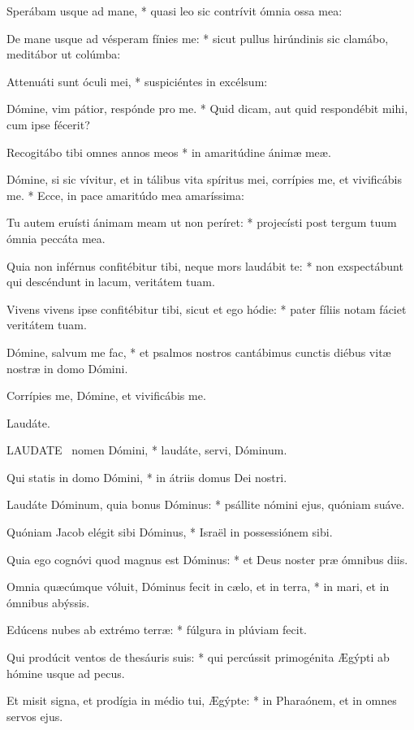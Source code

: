 Sperábam usque ad mane, * quasi leo sic contrívit ómnia ossa mea:

De mane usque ad vésperam fínies me: * sicut pullus hirúndinis sic clamábo, meditábor ut colúmba:

Attenuáti sunt óculi mei, * suspiciéntes in excélsum:

Dómine, vim pátior, respónde pro me. * Quid dicam, aut quid respondébit mihi, cum ipse fécerit?

Recogitábo tibi omnes annos meos * in amaritúdine ánimæ meæ.

Dómine, si sic vívitur, et in tálibus vita spíritus mei, corrípies me, et vivificábis me. * Ecce, in pace amaritúdo mea amaríssima:

Tu autem eruísti ánimam meam ut non períret: * projecísti post tergum tuum ómnia peccáta mea.

Quia non inférnus confitébitur tibi, neque mors laudábit te: * non exspectábunt qui descéndunt in lacum, veritátem tuam.

Vivens vivens ipse confitébitur tibi, sicut et ego hódie: * pater fíliis notam fáciet veritátem tuam.

Dómine, salvum me fac, * et psalmos nostros cantábimus cunctis diébus vitæ nostræ in domo Dómini.

 Corrípies me, Dómine, et vivificábis me.

 Laudáte. \textdagger


\lettrine[lines=2]{L}{AUDATE} \textdagger\ nomen Dómini, * laudáte, servi, Dóminum.

Qui statis in domo Dómini, * in átriis domus Dei nostri.

Laudáte Dóminum, quia bonus Dóminus: * psállite nómini ejus, quóniam suáve.

Quóniam Jacob elégit sibi Dóminus, * Israël in possessiónem sibi.

Quia ego cognóvi quod magnus est Dóminus: * et Deus noster præ ómnibus diis.

Omnia quæcúmque vóluit, Dóminus fecit in cælo, et in terra, * in mari, et in ómnibus abýssis.

Edúcens nubes ab extrémo terræ: * fúlgura in plúviam fecit.

Qui prodúcit ventos de thesáuris suis: * qui percússit primogénita Ægýpti ab hómine usque ad pecus.

Et misit signa, et prodígia in médio tui, Ægýpte: * in Pharaónem, et in omnes servos ejus.

